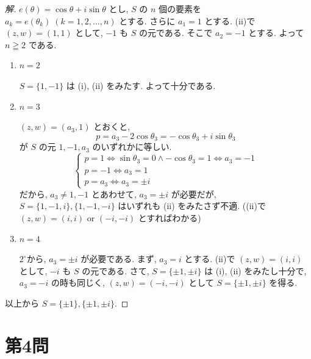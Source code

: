 \documentclass[../main.tex]{subfiles}
\begin{document}
\begin{proof}[解]
  $e(\theta) = \cos\theta + i \sin\theta$ とし, $S$ の $n$ 個の要素を $a_k = e(\theta_k) \; (k=1, 2, \dots, n)$ とする. さらに $a_1 = 1$ とする. (ii)で $(z, w) = (1, 1)$ として, $-1$ も $S$ の元である. そこで $a_2 = -1$ とする. よって $n \geqq 2$ である.

  \begin{enumerate}
    \item[$1^\circ$] $n=2$

      $S = \{1, -1\}$ は (i), (ii) をみたす. よって十分である.

    \item[$2^\circ$] $n=3$

      $(z, w) = (a_3, 1)$ とおくと,
      \[
        p = a_3 - 2 \cos\theta_3 = -\cos\theta_3 + i \sin\theta_3
      \]
      が $S$ の元 $1, -1, a_3$ のいずれかに等しい.
      \[
        \begin{cases}
          p = 1 \iff \sin\theta_3 = 0 \land -\cos\theta_3 = 1 \iff a_3 = -1 \\
          p = -1 \iff a_3 = 1 \\
          p = a_3 \iff a_3 = \pm i
        \end{cases}
      \]
      だから, $a_3 \neq 1, -1$ とあわせて, $a_3 = \pm i$ が必要だが, $S = \{1, -1, i\}, \{1, -1, -i\}$ はいずれも (ii) をみたさず不適. ((ii)で $(z, w) = (i, i)$ or $(-i, -i)$ とすればわかる)

    \item[$3^\circ$] $n=4$

      $2^\circ$から, $a_3 = \pm i$ が必要である. まず, $a_3 = i$ とする. (ii)で $(z, w) = (i, i)$ として, $-i$ も $S$ の元である. さて, $S = \{\pm 1, \pm i\}$ は (i), (ii) をみたし十分で, $a_3 = -i$ の時も同じく, $(z, w) = (-i, -i)$ として $S = \{\pm 1, \pm i\}$ を得る.
  \end{enumerate}

  以上から $S = \{\pm 1\}, \{\pm 1, \pm i\}$.
\end{proof}

\section*{第4問}
\end{document}
